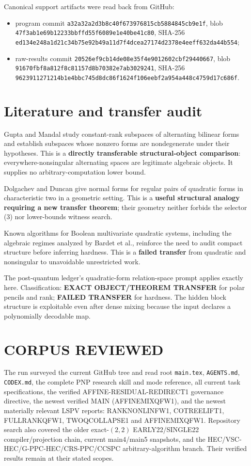 \documentclass[11pt]{article}
\begin{document}
Canonical support artifacts were read back from GitHub:
\begin{itemize}
\item program commit
  \texttt{a32a32a2d3b8c40f673976815cb5884845cb9e1f}, blob
  \texttt{47f3ab1e69b12233bbffd55f6089e1e40be41c80}, SHA-256
  \texttt{ed134e248a1d21c34b75e92b49a11d7f4dcea27174d2378e4eeff632da44b554};
\item raw-results commit
  \texttt{20526ef9cb14de08e35f4e9012602cbf29440667}, blob
  \texttt{91670fbf8a812f8c81157d8b70382e7ab3029241}, SHA-256
  \texttt{9623911271214b1e4bbc745d8dc86f1624f106eebf2a954a448c4759d17c686f}.
\end{itemize}

\section{Literature and transfer audit}
Gupta and Mandal study constant-rank subspaces of alternating bilinear forms
and establish subspaces whose nonzero forms are nondegenerate under their
hypotheses.  This is a \textbf{directly transferable structural-object
comparison}: everywhere-nonsingular alternating spaces are legitimate
algebraic objects.  It supplies no arbitrary-computation lower bound.

Dolgachev and Duncan give normal forms for regular pairs of quadratic forms
in characteristic two in a geometric setting.  This is a \textbf{useful
structural analogy requiring a new transfer theorem}; their geometry neither
forbids the selector (3) nor lower-bounds witness search.

Known algorithms for Boolean multivariate quadratic systems, including the
algebraic regimes analyzed by Bardet et al., reinforce the need to audit
compact structure before inferring hardness.  This is a
\textbf{failed transfer} from quadratic and nonsingular to unavoidable
unrestricted work.

The post-quantum ledger's quadratic-form relation-space prompt applies
exactly here.  Classification: \textbf{EXACT OBJECT/THEOREM TRANSFER} for
polar pencils and rank; \textbf{FAILED TRANSFER} for hardness.  The hidden
block structure is exploitable even after dense mixing because the input
declares a polynomially decodable map.

\section{CORPUS REVIEWED}
The run surveyed the current GitHub tree and read root
\texttt{main.tex}, \texttt{AGENTS.md}, \texttt{CODEX.md}, the complete PNP
research skill and mode reference, all current task specifications, the
verified AFFINE-RESIDUAL-REDIRECT1 governance directive, the newest verified
MAIN (AFFINEMIXQFW1), and the newest materially relevant LSPV reports:
RANKNONLINFW1, COTREELIFT1, FULLRANKQFW1, TWOQCOLLAPSE1 and
AFFINEMIXQFW1.  Repository search also covered the older exact-\((2,2)\)
EARLY22/SINGLE22 compiler/projection chain, current main4/main5 snapshots,
and the HEC/VSC-HEC/G-PPC-HEC/CRS-PPC/CCSPC arbitrary-algorithm branch.
Their verified results remain at their stated scopes.
\end{document}
